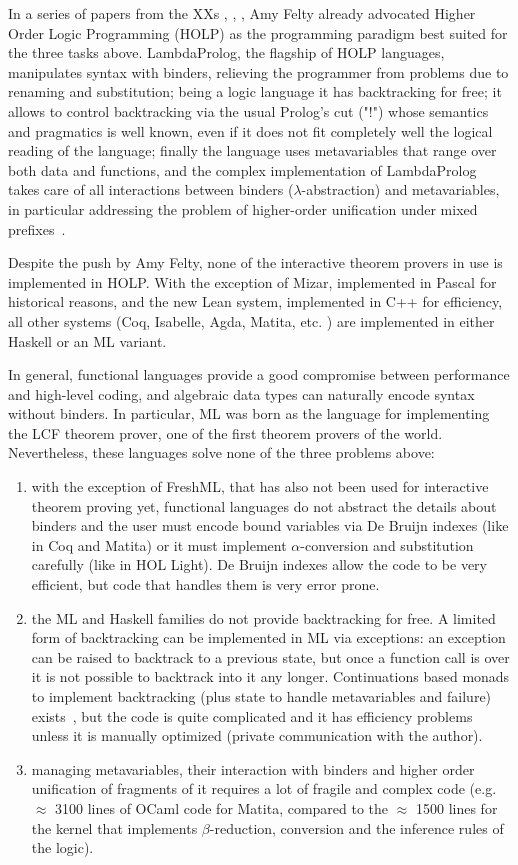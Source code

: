 \documentclass[preprint]{sigplanconf}
\begin{document}
In a series of papers from the XXs \cite{amy1}, \cite{amy4}, \cite{amy3}, Amy Felty already advocated Higher Order Logic Programming (HOLP) as the programming paradigm best suited for the three tasks above. LambdaProlog, the flagship of HOLP languages, manipulates syntax with binders, relieving the programmer from problems due to renaming and substitution; being a logic language it has backtracking for free; it allows to control backtracking via the usual Prolog's cut ("!") whose semantics and pragmatics is well known, even if it does not fit completely well the logical reading of the language; finally the language uses metavariables that range over both data and functions, and the complex implementation of LambdaProlog takes care of all interactions between binders ($\lambda$-abstraction) and metavariables, in particular addressing the problem of higher-order unification under mixed prefixes~\cite{miller1}.

Despite the push by Amy Felty, none of the interactive theorem provers in use is implemented in HOLP. With the exception of Mizar, implemented in Pascal for historical reasons, and the new Lean system, implemented in C++ for efficiency, all other systems (Coq, Isabelle, Agda, Matita, etc. \cite{17thproversoftheworld}) are implemented in either Haskell or an ML variant.

In general, functional languages provide a good compromise between performance and high-level coding, and algebraic data types can naturally encode syntax without binders. In particular, ML was born as the language for implementing the LCF theorem prover, one of the first theorem provers of the world. Nevertheless, these languages solve none of the three problems above:
\begin{enumerate}
\item with the exception of FreshML, that has also not been used for interactive theorem proving yet, functional languages do not abstract the details about binders and the user must encode bound variables via De Bruijn indexes (like in Coq and Matita) or it must implement $\alpha$-conversion and substitution carefully (like in HOL Light). De Bruijn indexes allow the code to be very efficient, but code that handles them is very error prone.
\item the ML and Haskell families do not provide backtracking for free. A limited form of backtracking can be implemented in ML via exceptions: an exception can be raised to backtrack to a previous state, but once a function call is over it is not possible to backtrack into it any longer. Continuations based monads to implement backtracking (plus state to handle metavariables and failure) exists~\cite{supermonad}, but the code is quite complicated and it has efficiency problems unless it is manually optimized (private communication with the author).
\item managing metavariables, their interaction with binders and higher order unification of fragments of it requires a lot of fragile and complex code (e.g. $\approx$ 3100 lines of OCaml code for Matita, compared to the $\approx$ 1500 lines for the kernel that implements $\beta$-reduction, conversion and the inference rules of the logic).
\end{enumerate}
\end{document}
